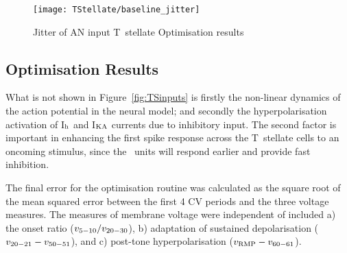 \begin{figure}[htb]
\centering%
\texttt{[image: TStellate/baseline\_jitter]}
\caption[]{Jitter of AN input T~stellate Optimisation results}\label{fig:CSjitter}
\end{figure}



\clearpage
\subsection{Optimisation Results}



What is not shown in Figure~\ref{fig:TSinputs} is firstly the non-linear dynamics of the action potential in the neural model; and secondly the hyperpolarisation activation of I$_{\rm h}$ and I$_{\rm KA}$ currents due to inhibitory input.
The second factor is important in enhancing the first spike response across the T~stellate cells \citep{PaoliniClareyEtAl:2004} to an oncoming stimulus, since the \OnC~units will respond earlier and provide fast inhibition.


The final error for the optimisation routine was calculated as the square root of the mean squared error between the first 4 CV periods and the three voltage measures.
The measures of membrane voltage were independent of \RMP included a) the onset ratio ($v_{\rm 5-10}/v_{\rm 20-30}$), b) adaptation of sustained depolarisation ($v_{\rm 20-21} - v_{\rm 50-51}$), and c) post-tone hyperpolarisation ($v_{\rm RMP} - v_{\rm 60-61}$).



